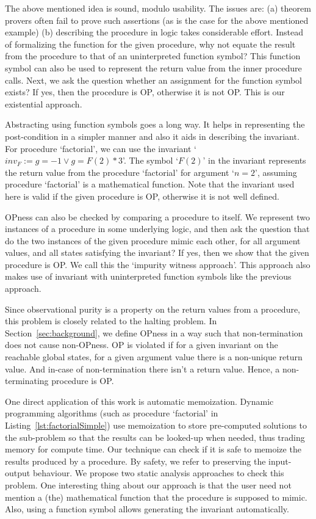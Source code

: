 \documentclass{llncs}
\newcommand{\inv}{\mathit{inv}}
\newcommand{\F}{\mathit{F}}
\begin{document}
The above mentioned idea is sound, modulo usability. The issues are:
(a) theorem provers often fail to prove such assertions (as is the
case for the above mentioned example) (b) describing the procedure in
logic takes considerable effort.  Instead of formalizing the function
for the given procedure, why not equate the result from the procedure
to that of an uninterpreted function symbol? This function symbol can
also be used to represent the return value from the inner procedure
calls. Next, we ask the question whether an assignment for the
function symbol exists? If yes, then the procedure is OP, otherwise it
is not OP.  This is our existential approach.

Abstracting using function symbols goes a long way. It helps in
representing the post-condition in a simpler manner and also it aids
in describing the invariant. For procedure `factorial', we can use
the invariant `$\inv_{\F}:=g = -1 \vee g = \F(2) * 3$'. The symbol
`$\F(2)$' in the invariant represents the return value from the
procedure `factorial' for argument `$n = 2$', assuming procedure
`factorial' is a mathematical function. Note that the invariant used
here is valid if the given procedure is OP, otherwise it is not well
defined.


OPness can also be checked by comparing a procedure to itself. We
represent two instances of a procedure in some underlying logic, and
then ask the question that do the two instances of the given procedure
mimic each other, for all argument values, and all states satisfying
the invariant? If yes, then we show that the given procedure is OP. We
call this the `impurity witness approach'.  This approach also makes
use of invariant with uninterpreted function symbols like the previous
approach.

Since observational purity is a property on the return values from a
procedure, this problem is closely related to the halting problem. In
Section~\ref{sec:background}, we define OPness in a way such that
non-termination does not cause non-OPness. OP is violated if for a
given invariant on the reachable global states, for a given argument
value there is a non-unique return value. And in-case of
non-termination there isn't a return value. Hence, a non-terminating
procedure is OP.

One direct application of this work is automatic memoization. Dynamic
programming algorithms (such as procedure `factorial' in
Listing~\ref{lst:factorialSimple}) use memoization to store
pre-computed solutions to the sub-problem so that the results can be
looked-up when needed, thus trading memory for compute time. Our
technique can check if it is safe to memoize the results produced by a
procedure. By safety, we refer to preserving the input-output
behaviour. We propose two static analysis approaches to check this
problem. One interesting thing about our approach is that the user
need not mention a (the) mathematical function that the procedure is
supposed to mimic. Also, using a function symbol allows generating the
invariant automatically.
\end{document}
